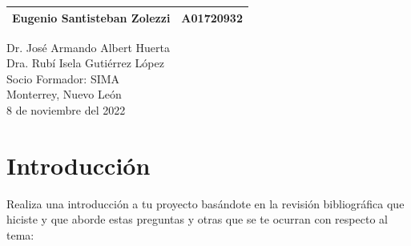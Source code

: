 \documentclass[10pt]{article}
\begin{document}
\begin{titlepage}
\begin{center}
\begin{table}[h!]
\begin{tabular}{ ||c|c|| }
                    \hline
                    Eugenio Santisteban Zolezzi & A01720932 \\
                    \hline
                \end{tabular}
            \end{table}
            \vspace{0.7cm}
            \large Dr. José Armando Albert Huerta \\ %
            \vspace{0.2cm}
            \large Dra. Rubí Isela Gutiérrez López \\ %
            \vspace{0.2cm}
            \large Socio Formador: SIMA \\
            \vspace{0.2cm}
            \large Monterrey, Nuevo León \\
            \vspace{0.2cm}
            \large 8 de noviembre del 2022 \\
            \vspace{1cm}
        \end{center}
    \end{titlepage}

    \tableofcontents
    \clearpage

    \section{Introducción}

        Realiza una introducción a tu proyecto basándote en la revisión bibliográfica que hiciste y que aborde estas preguntas y otras que se te ocurran con respecto al tema:
\end{document}
